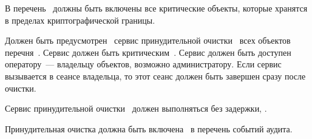 \label{R.DE.Long}
В перечень~ должны быть включены все критические объекты, 
которые хранятся в пределах криптографической границы.

\label{R.DE.Service}
Должен быть предусмотрен~ сервис принудительной 
очистки~ всех объектов перечня~.
%
Сервис должен быть критическим~.
%
Сервис должен быть доступен~ оператору~--- владельцу 
объектов, возможно администратору.
%
Если сервис вызывается в сеансе владельца, то этот сеанс должен быть 
завершен сразу после очистки.

\label{R.DE.Immediate}
Сервис принудительной очистки~ должен выполняться 
без задержки, .

\label{R.DE.AU}
Принудительная очистка должна быть включена~ в перечень 
событий аудита.

